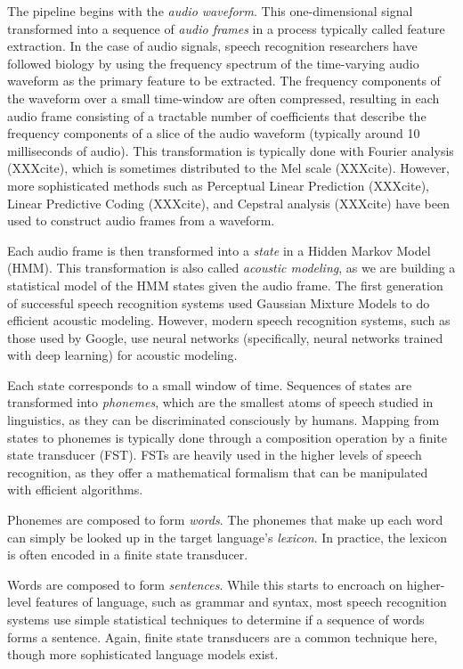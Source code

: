 \documentclass{article}
\begin{document}
The pipeline begins with the \textit{audio waveform}.
This one-dimensional signal transformed
into a sequence of \textit{audio frames}
in a process typically called feature extraction.
In the case of audio signals,
speech recognition researchers have followed
biology by using the frequency spectrum
of the time-varying audio waveform
as the primary feature to be extracted.
The frequency components of the waveform
over a small time-window are often compressed,
resulting in each audio frame consisting of
a tractable number of coefficients
that describe the frequency components
of a slice of the audio waveform
(typically around 10 milliseconds of audio).
This transformation is typically done
with Fourier analysis (XXXcite),
which is sometimes distributed
to the Mel scale (XXXcite).
However, more sophisticated methods
such as Perceptual Linear Prediction (XXXcite),
Linear Predictive Coding (XXXcite),
and Cepstral analysis (XXXcite) have been
used to construct audio frames from a waveform.

Each audio frame is then transformed
into a \textit{state}
in a Hidden Markov Model (HMM).
This transformation is also called
\textit{acoustic modeling},
as we are building a statistical model
of the HMM states given the audio frame.
The first generation of successful
speech recognition systems
used Gaussian Mixture Models
to do efficient acoustic modeling.
However, modern speech recognition systems,
such as those used by Google,
use neural networks
(specifically, neural networks trained with deep learning)
for acoustic modeling.

Each state corresponds to a small window of time.
Sequences of states are transformed
into \textit{phonemes},
which are the smallest atoms of speech
studied in linguistics,
as they can be discriminated consciously by humans.
Mapping from states to phonemes
is typically done through a composition operation
by a finite state transducer (FST).
FSTs are heavily used in the higher levels
of speech recognition,
as they offer a mathematical formalism
that can be manipulated with efficient algorithms.

Phonemes are composed to form \textit{words}.
The phonemes that make up each word
can simply be looked up
in the target language's \textit{lexicon}.
In practice, the lexicon is often encoded
in a finite state transducer.

Words are composed to form \textit{sentences}.
While this starts to encroach
on higher-level features of language,
such as grammar and syntax,
most speech recognition systems
use simple statistical techniques
to determine if a sequence of words
forms a sentence.
Again, finite state transducers
are a common technique here,
though more sophisticated language models exist.
\end{document}
